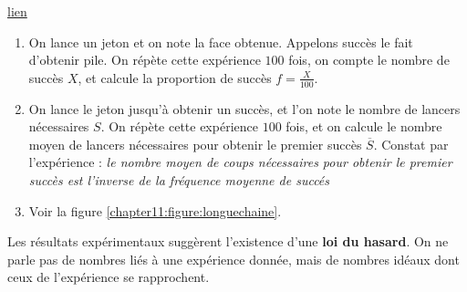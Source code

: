 \documentclass[main.tex]{subfiles}
\begin{document}
\begin{example}\label{chapter09:example:01}\href{https://mathigon.org/polypad/tvCTT15RPLcYw}{lien}\begin{enumerate}[label=\alph*),leftmargin=*]
		\item On lance un jeton et on note la face obtenue. Appelons succès le fait d'obtenir pile. On répète cette expérience $100$ fois, on compte le nombre de succès $X$, et calcule la proportion de succès $f=\frac{X}{100}$.
		
		
		\vfill 
		\item On lance le jeton jusqu'à obtenir un succès, et l'on note le nombre de lancers nécessaires $S$. On répète cette expérience $100$ fois, et on calcule le nombre moyen de lancers nécessaires pour obtenir le premier succès $\overline{S}$. 
		\vfill 
Constat par l'expérience : \emph{le nombre moyen de coups nécessaires pour obtenir le premier succès est l'inverse de la fréquence moyenne de succés}
		\item Voir la figure \ref{chapter11:figure:longuechaine}.
\begin{marginfigure}[-4cm]
\caption{Pour 20 lancers, on compte la répétition  de piles, ou la répétition  de faces la plus longue.}
\label{chapter11:figure:longuechaine}
\end{marginfigure}
\end{enumerate} 
\end{example} 
\noindent Les résultats expérimentaux suggèrent l'existence d'une \textbf{loi du hasard}. On ne parle pas de nombres liés à une expérience donnée, mais de \og nombres idéaux \fg{} dont ceux de l'expérience se rapprochent.
 
\end{document}
